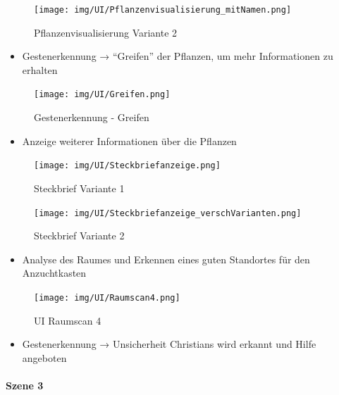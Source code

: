 \begin{figure}
\centering
\texttt{[image: img/UI/Pflanzenvisualisierung\_mitNamen.png]}
\caption{Pflanzenvisualisierung Variante 2}
\end{figure}

\begin{itemize}
\tightlist
\item
  Gestenerkennung → ``Greifen'' der Pflanzen, um mehr Informationen zu
  erhalten
\end{itemize}

\begin{figure}
\centering
\texttt{[image: img/UI/Greifen.png]}
\caption{Gestenerkennung - Greifen}
\end{figure}

\begin{itemize}
\tightlist
\item
  Anzeige weiterer Informationen über die Pflanzen
\end{itemize}

\begin{figure}
\centering
\texttt{[image: img/UI/Steckbriefanzeige.png]}
\caption{Steckbrief Variante 1}
\end{figure}

\begin{figure}
\centering
\texttt{[image: img/UI/Steckbriefanzeige\_verschVarianten.png]}
\caption{Steckbrief Variante 2}
\end{figure}

\begin{itemize}
\tightlist
\item
  Analyse des Raumes und Erkennen eines guten Standortes für den
  Anzuchtkasten
\end{itemize}

\begin{figure}
\centering
\texttt{[image: img/UI/Raumscan4.png]}
\caption{UI Raumscan 4}
\end{figure}

\begin{itemize}
\tightlist
\item
  Gestenerkennung → Unsicherheit Christians wird erkannt und Hilfe
  angeboten
\end{itemize}

\hypertarget{szene-3}{%
\paragraph{Szene 3}\label{szene-3}}

